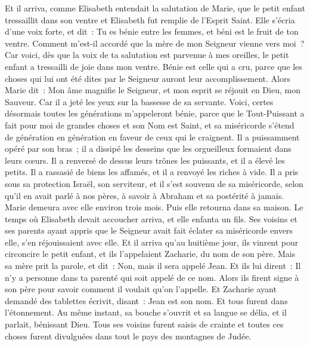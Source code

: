 \begin{multicols}{2}
Et il arriva, comme Elisabeth entendait la salutation de Marie, que le petit enfant tressaillit dans son ventre et Elisabeth fut remplie de l'Esprit Saint.
Elle s'écria d'une voix forte, et dit~: Tu es bénie entre les femmes, et béni est le fruit de ton ventre.
Comment m'est-il accordé que la mère de mon Seigneur vienne vers moi~?
Car voici, dès que la voix de ta salutation est parvenue à mes oreilles, le petit enfant a tressailli de joie dans mon ventre.
Bénie est celle qui a cru, parce que les choses qui lui ont été dites par le Seigneur auront leur accomplissement.
Alors Marie dit~: Mon âme magnifie le Seigneur,
et mon esprit se réjouit en Dieu, mon Sauveur.
Car il a jeté les yeux sur la bassesse de sa servante. Voici, certes désormais toutes les générations m'appeleront bénie,
parce que le Tout-Puissant a fait pour moi de grandes choses et son Nom est Saint,
et sa miséricorde s'étend de génération en génération en faveur de ceux qui le craignent.
Il a puissamment opéré par son bras~; il a dissipé les desseins que les orgueilleux formaient dans leurs cœurs.
Il a renversé de dessus leurs trônes les puissants, et il a élevé les petits.
Il a rassasié de biens les affamés, et il a renvoyé les riches à vide.
Il a pris sous sa protection Israël, son serviteur, et il s'est souvenu de sa miséricorde,
selon qu'il en avait parlé à nos pères, à savoir à Abraham et sa postérité à jamais.
Marie demeura avec elle environ trois mois. Puis elle retourna dans sa maison.
Le temps où Elisabeth devait accoucher arriva, et elle enfanta un fils.
Ses voisins et ses parents ayant appris que le Seigneur avait fait éclater sa miséricorde envers elle, s'en réjouissaient avec elle.
Et il arriva qu'au huitième jour, ils vinrent pour circoncire le petit enfant, et ils l'appelaient Zacharie, du nom de son père.
Mais sa mère prit la parole, et dit~: Non, mais il sera appelé Jean.
Et ils lui dirent~: Il n'y a personne dans ta parenté qui soit appelé de ce nom.
Alors ils firent signe à son père pour savoir comment il voulait qu'on l'appelle.
Et Zacharie ayant demandé des tablettes écrivit, disant~: Jean est son nom. Et tous furent dans l'étonnement.
Au même instant, sa bouche s'ouvrit et sa langue se délia, et il parlait, bénissant Dieu.
Tous ses voisins furent saisis de crainte et toutes ces choses furent divulguées dans tout le pays des montagnes de Judée.

\end{multicols}
